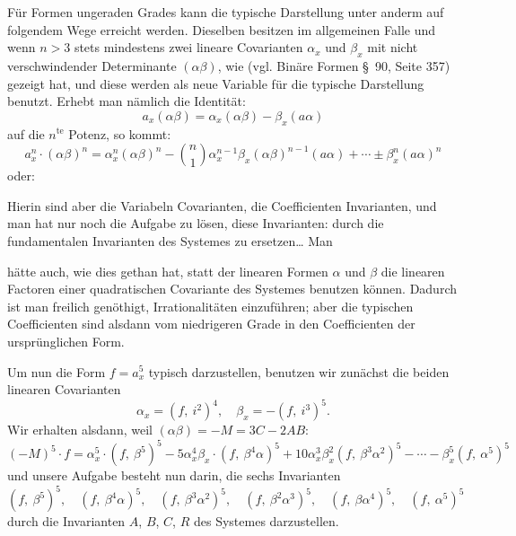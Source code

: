 Für Formen ungeraden Grades kann die typische Darstellung unter
anderm auf folgendem Wege erreicht werden. Dieselben besitzen im
allgemeinen Falle und wenn $n > 3$ stets mindestens zwei lineare
Covarianten $\alpha_x$ und $\beta_x$ mit nicht verschwindender Determinante $(\alpha\beta)$,
wie  (vgl. \glqq Binäre Formen\grqq{} \S~90, Seite 357) gezeigt hat, und
diese werden als neue Variable für die typische Darstellung benutzt.
Erhebt man nämlich die Identität:
\[
a_x(\alpha\beta) = \alpha_x(\alpha\beta) - \beta_x(a\alpha)
\]
auf die $n^{\mathrm{te}}$ Potenz, so kommt:
\[
a_x^n \cdot (\alpha\beta)^n = \alpha_x^n(\alpha\beta)^n - \binom{n}{1}\alpha_x^{n-1}\beta_x(\alpha\beta)^{n-1}(a\alpha) + \cdots \pm \beta_x^n(a\alpha)^n
\]
oder:

Hierin sind aber die Variabeln Covarianten, die Coefficienten Invarianten,
und man hat nur noch die Aufgabe zu lösen, diese Invarianten:
durch die fundamentalen Invarianten des Systemes zu ersetzen\ldots{} Man



hätte auch, wie dies  gethan hat, statt der linearen Formen
$\alpha$ und $\beta$ die linearen Factoren einer quadratischen Covariante des
Systemes benutzen können. Dadurch ist man freilich genöthigt, Irrationalitäten
einzuführen; aber die typischen Coefficienten sind alsdann
vom niedrigeren Grade in den Coefficienten der ursprünglichen Form.

Um nun die Form $f = a_x^5$ typisch darzustellen, benutzen wir zunächst
die beiden linearen Covarianten
\[
\alpha_x = (f,\ i^2)^4, \quad \beta_x = -(f,\ i^3)^5.
\]
Wir erhalten alsdann, weil $(\alpha\beta) = -M = 3C - 2AB$:
\[
(-M)^5 \cdot f = \alpha_x^5 \cdot (f,\ \beta^5)^5 - 5\alpha_x^4\beta_x \cdot (f,\ \beta^4\alpha)^5
+ 10\alpha_x^3\beta_x^2(f,\ \beta^3\alpha^2)^5 - \cdots - \beta_x^5(f,\ \alpha^5)^5
\]
und unsere Aufgabe besteht nun darin, die sechs Invarianten
\[
(f,\ \beta^5)^5,\quad (f,\ \beta^4\alpha)^5,\quad (f,\ \beta^3\alpha^2)^5,\quad (f,\ \beta^2\alpha^3)^5,\quad (f,\ \beta\alpha^4)^5,\quad (f,\ \alpha^5)^5
\]
durch die Invarianten $A$, $B$, $C$, $R$ des Systemes darzustellen.

